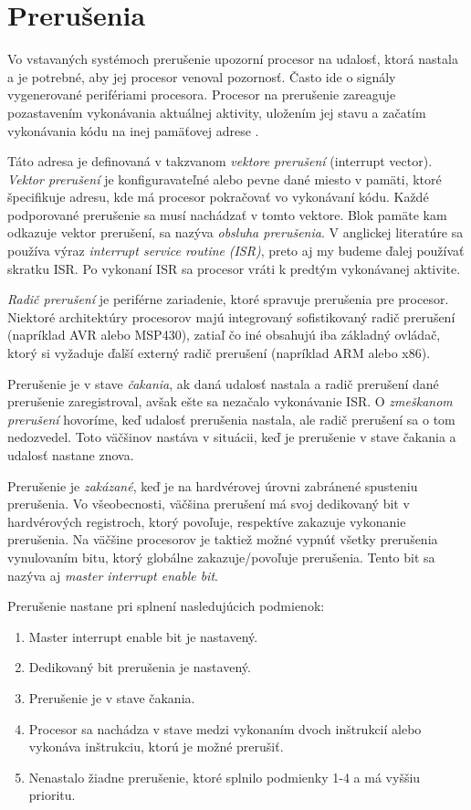 \section{Prerušenia}
\noindent Vo vstavaných systémoch prerušenie upozorní procesor na udalosť, ktorá nastala a je potrebné, aby jej procesor venoval pozornosť. Často ide o signály vygenerované perifériami procesora. Procesor na prerušenie zareaguje pozastavením vykonávania aktuálnej aktivity, uložením jej stavu a začatím vykonávania kódu na inej pamäťovej adrese \cite{wangAutomaticDetectionValidation2017}. \par 
Táto adresa je definovaná v takzvanom \textit{vektore prerušení} (interrupt vector). \textit{Vektor prerušení} je konfiguravateľné alebo pevne dané miesto v pamäti, ktoré špecifikuje adresu, kde má procesor pokračovať vo vykonávaní kódu. Každé podporované prerušenie sa musí nachádzať v tomto vektore. Blok pamäte kam odkazuje vektor prerušení, sa nazýva \textit{obsluha prerušenia}. V anglickej literatúre sa používa výraz \textit{interrupt service routine} \textit{(ISR)}, preto aj my budeme ďalej používať skratku  ISR. Po vykonaní  ISR sa procesor vráti k predtým vykonávanej aktivite. \par
\textit{Radič prerušení} je periférne zariadenie, ktoré spravuje prerušenia pre procesor. Niektoré architektúry procesorov majú integrovaný sofistikovaný radič prerušení (napríklad AVR alebo MSP430), zatiaľ čo iné obsahujú iba základný ovládač, ktorý si vyžaduje ďalší externý radič prerušení (napríklad ARM alebo x86). \par
Prerušenie je v stave \textit{čakania}, ak daná udalosť nastala a radič prerušení dané prerušenie zaregistroval, avšak ešte sa nezačalo vykonávanie ISR.  O \textit{zmeškanom prerušení} hovoríme, keď udalosť prerušenia nastala, ale radič prerušení sa o tom nedozvedel. Toto väčšinov nastáva v situácii, keď je prerušenie v stave čakania a udalosť nastane znova. \par
Prerušenie je \textit{zakázané}, keď je na hardvérovej úrovni zabránené spusteniu prerušenia. Vo všeobecnosti, väčšina prerušení má svoj dedikovaný bit v hardvérových registroch, ktorý povoľuje, respektíve zakazuje vykonanie prerušenia. Na väčšine procesorov je taktiež možné vypnúť všetky prerušenia vynulovaním bitu, ktorý globálne zakazuje/povoľuje prerušenia. Tento bit sa nazýva aj \textit{master interrupt enable bit}.\par 
Prerušenie nastane pri splnení nasledujúcich podmienok:
\begin{enumerate}
    \item Master interrupt enable bit je nastavený.
    \item Dedikovaný bit prerušenia je nastavený.
    \item Prerušenie je v stave čakania.
    \item Procesor sa nachádza v stave medzi vykonaním dvoch inštrukcií alebo vykonáva inštrukciu, ktorú je možné prerušiť.
    \item Nenastalo žiadne prerušenie, ktoré splnilo podmienky 1-4 a má vyššiu prioritu.
\end{enumerate} \par

